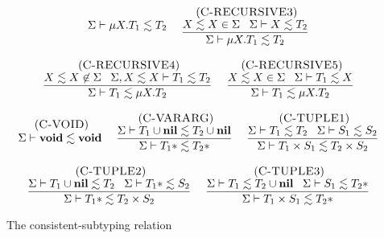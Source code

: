 \begin{figure}[!ht]
\begin{footnotesize}
$$\begin{array}{c}
\begin{array}{c}
      {\Sigma\vdash \mu X.T_{1} \lesssim T_{2}}
\end{array}
\;
\begin{array}{c}
\; (\textsc{C-RECURSIVE3})\\
\dfrac{X \lesssim X \in \Sigma \;\;\;
       \Sigma \vdash X \lesssim T_{2}}
      {\Sigma \vdash \mu X.T_{1} \lesssim T_{2}}
\end{array}
\\ \\
\begin{array}{c}
\; (\textsc{C-RECURSIVE4})\\
\dfrac{X \lesssim X \not\in \Sigma \;\;\;
       \Sigma, X \lesssim X \vdash T_{1} \lesssim T_{2}}
      {\Sigma \vdash T_{1} \lesssim \mu X.T_{2}}
\end{array}
\;
\begin{array}{c}
\; (\textsc{C-RECURSIVE5})\\
\dfrac{X \lesssim X \in \Sigma \;\;\;
       \Sigma \vdash T_{1} \lesssim X}
      {\Sigma \vdash T_{1} \lesssim \mu X.T_{2}}
\end{array}
\\ \\
\begin{array}{c}
\; (\textsc{C-VOID})\\
\Sigma \vdash \mathbf{void} \lesssim \mathbf{void}
\end{array}
\;
\begin{array}{c}
\; (\textsc{C-VARARG})\\
\dfrac{\Sigma \vdash T_{1} \cup \mathbf{nil} \lesssim T_{2} \cup \mathbf{nil}}
      {\Sigma \vdash T_{1}* \lesssim T_{2}*}
\end{array}
\;
\begin{array}{c}
\; (\textsc{C-TUPLE1})\\
\dfrac{\Sigma \vdash T_{1} \lesssim T_{2} \;\;\;
       \Sigma \vdash S_{1} \lesssim S_{2}}
      {\Sigma \vdash T_{1} \times S_{1} \lesssim T_{2} \times S_{2}}
\end{array}
\\ \\
\begin{array}{c}
\; (\textsc{C-TUPLE2})\\
\dfrac{\Sigma \vdash T_{1} \cup \mathbf{nil} \lesssim T_{2} \;\;\;
       \Sigma \vdash T_{1}* \lesssim S_{2}}
      {\Sigma \vdash T_{1}* \lesssim T_{2} \times S_{2}}
\end{array}
\;
\begin{array}{c}
\; (\textsc{C-TUPLE3})\\
\dfrac{\Sigma \vdash T_{1} \lesssim T_{2} \cup \mathbf{nil} \;\;\;
       \Sigma \vdash S_{1} \lesssim T_{2}*}
      {\Sigma \vdash T_{1} \times S_{1} \lesssim T_{2}*}
\end{array}
\end{array}
$$
\end{footnotesize}
\dend
\caption{The consistent-subtyping relation}
\label{fig:consistent_subtyping}
\end{figure}

